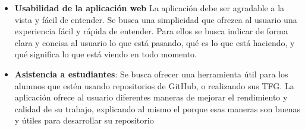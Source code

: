 \begin{itemize}
	\item \textbf{Usabilidad de la aplicación web} La aplicación debe ser agradable a la vista y fácil de entender. Se busca una simplicidad que ofrezca al usuario una experiencia fácil y rápida de entender. Para ellos se busca indicar de forma clara y concisa al usuario lo que está pasando, qué es lo que está haciendo, y qué significa lo que está viendo en todo momento.
    
	\item \textbf{Asistencia a estudiantes}: Se busca ofrecer una herramienta útil para los alumnos que estén usando repositorios de GitHub, o realizando sus TFG. La aplicación ofrece al usuario diferentes maneras de mejorar el rendimiento y calidad de su trabajo, explicando al mismo el porque esas maneras son buenas y útiles para desarrollar su repositorio
    
\end{itemize}